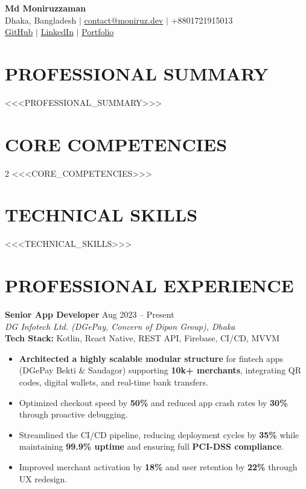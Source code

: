 \documentclass[10pt,a4paper]{article}
\begin{document}
\begin{center}
    {\LARGE \textbf{Md Moniruzzaman}} \\
    \vspace{4pt}
    Dhaka, Bangladesh $|$ \href{mailto:contact@moniruz.dev}{contact@moniruz.dev} $|$ +8801721915013 \\
    \href{https://github.com/filelucker}{GitHub} $|$ \href{https://www.linkedin.com/in/mon000/}{LinkedIn} $|$ \href{https://moniruz.dev/}{Portfolio} \\
    \vspace{2pt}
\end{center}

\section*{PROFESSIONAL SUMMARY}
<<<PROFESSIONAL_SUMMARY>>>

\section*{CORE COMPETENCIES}
\begin{itemize}
    \begin{multicols}{2}
<<<CORE_COMPETENCIES>>>
    \end{multicols}
\end{itemize}

\section*{TECHNICAL SKILLS}
<<<TECHNICAL_SKILLS>>>

\vspace{4pt}

\section*{PROFESSIONAL EXPERIENCE}

\textbf{Senior App Developer} \hfill Aug 2023 -- Present \\
\textit{DG Infotech Ltd. (DGePay, Concern of Dipon Group), Dhaka} \\
\textbf{Tech Stack:} Kotlin, React Native, REST API, Firebase, CI/CD, MVVM
\begin{itemize}
\item \textbf{Architected a highly scalable modular structure} for fintech apps (DGePay Bekti \& Saudagor) supporting \textbf{10k+ merchants}, integrating QR codes, digital wallets, and real-time bank transfers.    
\item Optimized checkout speed by \textbf{50\%} and reduced app crash rates by \textbf{30\%} through proactive debugging.
\item Streamlined the CI/CD pipeline, reducing deployment cycles by \textbf{35\%} while maintaining \textbf{99.9\% uptime} and ensuring full \textbf{PCI-DSS compliance}.    
\item Improved merchant activation by \textbf{18\%} and user retention by \textbf{22\%} through UX redesign.
\end{itemize}
\end{document}
